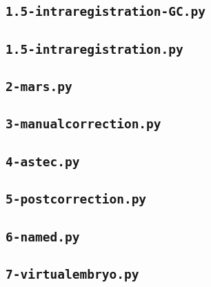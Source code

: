 \subsection{\texttt{1.5-intraregistration-GC.py}}

\subsection{\texttt{1.5-intraregistration.py}}

\subsection{\texttt{2-mars.py}}

\subsection{\texttt{3-manualcorrection.py}}

\subsection{\texttt{4-astec.py}}

\subsection{\texttt{5-postcorrection.py}}

\subsection{\texttt{6-named.py}}

\subsection{\texttt{7-virtualembryo.py}}




